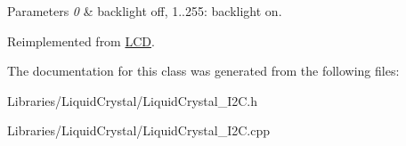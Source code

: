 \begin{DoxyParams}{Parameters}
{\em 0} & backlight off, 1..255\+: backlight on. \\
\hline
\end{DoxyParams}


Reimplemented from \hyperlink{class_l_c_d_a53f4ee9b39d9ab3d7ae4d9f8dedca3bc}{L\+C\+D}.



The documentation for this class was generated from the following files\+:\begin{DoxyCompactItemize}
\item 
Libraries/\+Liquid\+Crystal/Liquid\+Crystal\+\_\+\+I2\+C.\+h\item 
Libraries/\+Liquid\+Crystal/Liquid\+Crystal\+\_\+\+I2\+C.\+cpp\end{DoxyCompactItemize}
